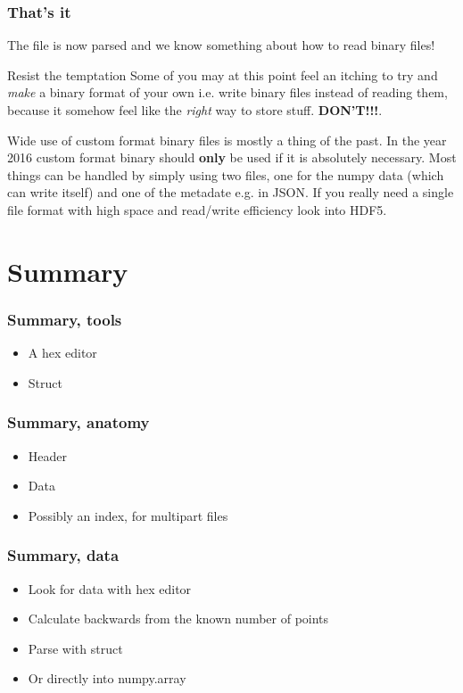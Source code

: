 \documentclass{beamer}
\begin{document}
\begin{frame}
  \frametitle{That's it}
  The file is now parsed and we know something about how to read binary files!
  \vspace{0.5cm}
  \begin{alertblock}{Resist the temptation}
    Some of you may at this point feel an itching to try and
    \textit{make} a binary format of your own i.e. write binary files
    instead of reading them, because it somehow feel like the
    \textit{right} way to store stuff. \textbf{DON'T!!!}.\newline
    
    Wide use of custom format binary files is mostly a thing of the
    past. In the year 2016 custom format binary should \textbf{only}
    be used if it is absolutely necessary. Most things can be handled
    by simply using two files, one for the numpy data (which can write
    itself) and one of the metadate e.g. in JSON. If you really need a
    single file format with high space and read/write efficiency look
    into HDF5.
  \end{alertblock}
\end{frame}

\section{Summary}
\begin{frame}
  \frametitle{Summary, tools}
  \begin{itemize}
  \item A hex editor
  \item Struct
  \end{itemize}
\end{frame}

\begin{frame}
  \frametitle{Summary, anatomy}
  \begin{itemize}
  \item Header
  \item Data
  \item Possibly an index, for multipart files
  \end{itemize}
\end{frame}

\begin{frame}
  \frametitle{Summary, data}
  \begin{itemize}
  \item Look for data with hex editor
  \item Calculate backwards from the known number of points
  \item Parse with struct
  \item Or directly into numpy.array
  \end{itemize}
\end{frame}
\end{document}
